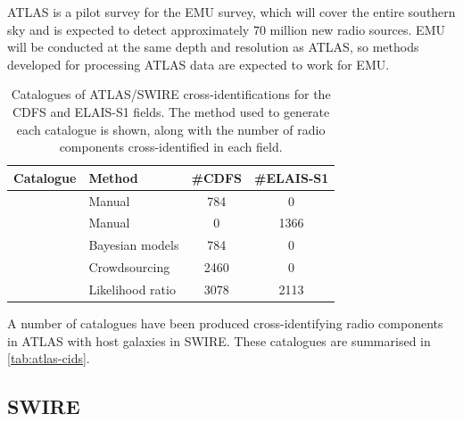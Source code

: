 \documentclass[fleqn,usenatbib,usedcolumn]{mnras}
\begin{document}
    ATLAS is a pilot survey for the EMU \citep{norris11} survey, which will
    cover the entire southern sky and is expected to detect approximately 70
    million new radio sources. EMU will be conducted at the same depth and
    resolution as ATLAS, so methods developed for processing ATLAS data are
    expected to work for EMU.

    \begin{table}
      \caption{Catalogues of ATLAS/SWIRE cross-identifications for the CDFS
        and ELAIS-S1 fields. The method used to generate each catalogue is
        shown, along with the number of radio components cross-identified in each
        field.}
      \label{tab:atlas-cids}
      \begin{tabular}{ll|cc}
        \hline
        Catalogue & Method & \#CDFS & \#ELAIS-S1\\
        \hline
        \citet{norris06} & Manual & 784 & 0\\
        \citet{middelberg08} & Manual & 0 & 1366\\
        \citet{fan15} & Bayesian models & 784 & 0\\
        \citet{wong17} & Crowdsourcing & 2460 & 0 \\
        \citet{weston17} & Likelihood ratio & 3078 & 2113\\
        \hline
      \end{tabular}
    \end{table}

    A number of catalogues have been produced cross-identifying radio components
    in ATLAS with host galaxies in SWIRE. These catalogues are summarised in
    \autoref{tab:atlas-cids}.



  \subsection{SWIRE}\label{sec:swire}
\end{document}
